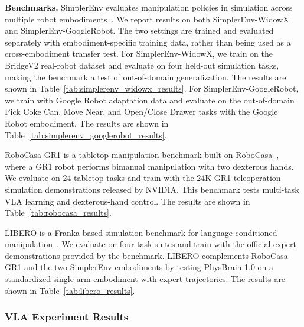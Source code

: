\documentclass{llmxive}
\providecommand{\paragraph}[1]{\noindent\textbf{#1.}\hspace*{1em}}
\begin{document}
\paragraph{Benchmarks}
SimplerEnv evaluates manipulation policies in simulation across multiple robot embodiments~\cite{SimplerEnv_2024_CoRL}. We report results on both SimplerEnv-WidowX and SimplerEnv-GoogleRobot. The two settings are trained and evaluated separately with embodiment-specific training data, rather than being used as a cross-embodiment transfer test. For SimplerEnv-WidowX, we train on the BridgeV2 real-robot dataset and evaluate on four held-out simulation tasks, making the benchmark a test of out-of-domain generalization. The results are shown in Table~\ref{tab:simplerenv_widowx_results}. For SimplerEnv-GoogleRobot, we train with Google Robot adaptation data and evaluate on the out-of-domain Pick Coke Can, Move Near, and Open/Close Drawer tasks with the Google Robot embodiment. The results are shown in Table~\ref{tab:simplerenv_googlerobot_results}.

RoboCasa-GR1 is a tabletop manipulation benchmark built on RoboCasa~\cite{RoboCasa_2024_RSS}, where a GR1 robot performs bimanual manipulation with two dexterous hands. We evaluate on 24 tabletop tasks and train with the 24K GR1 teleoperation simulation demonstrations released by NVIDIA. This benchmark tests multi-task VLA learning and dexterous-hand control. The results are shown in Table~\ref{tab:robocasa_results}.

LIBERO is a Franka-based simulation benchmark for language-conditioned manipulation~\cite{LIBERO_2023_NeurIPS}. We evaluate on four task suites and train with the official expert demonstrations provided by the benchmark. LIBERO complements RoboCasa-GR1 and the two SimplerEnv embodiments by testing PhysBrain 1.0 on a standardized single-arm embodiment with expert trajectories. The results are shown in Table~\ref{tab:libero_results}.

\subsubsection{VLA Experiment Results}
\end{document}
